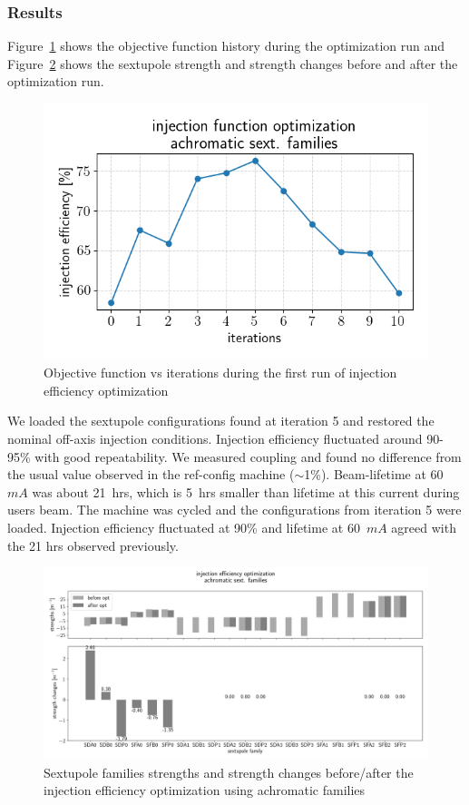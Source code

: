 \documentclass[a4paper,11pt]{article}
\begin{document}
\subsubsection{Results} Figure~\ref{achrom_obj} shows the objective function history during the optimization run and Figure~\ref{achrom_sexts} shows the sextupole strength and strength changes before and after the optimization run. 
\begin{figure}
    \centering
    \includegraphics[width=0.7\columnwidth]{achromatic_fams_objective_func.png}
    \caption{Objective function vs iterations during the first run of injection efficiency optimization}
    \label{achrom_obj}
\end{figure}
We loaded the sextupole configurations found at iteration 5 and restored the nominal off-axis injection conditions. Injection efficiency fluctuated around 90-95\% with good repeatability. We measured coupling and found no difference from the usual value observed in the ref-config machine ($\sim$1\%). Beam-lifetime at 60~$\unit{mA}$ was about 21~hrs, which is 5~hrs smaller than lifetime at this current during users beam. The machine was cycled and the configurations from iteration 5 were loaded. Injection efficiency fluctuated at 90\%  and lifetime at 60~$\unit{mA}$ agreed with the 21 hrs observed previously.
\begin{figure}[t]
    \centering
    \includegraphics*[width=\textwidth]{sexts_fams_configs.png}
    \caption{Sextupole families strengths and strength changes before/after the injection efficiency optimization using achromatic families}
    \label{achrom_sexts}
\end{figure}
\end{document}
